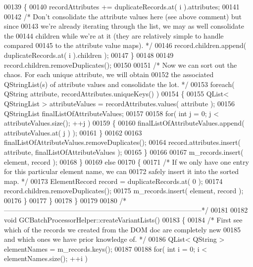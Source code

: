 \begin{DoxyCode}
00139       \{
00140         recordAttributes += duplicateRecords.at( i ).attributes;
00141 
00142         \textcolor{comment}{/* Don't consolidate the attribute values here (see above comment) but
       since}
00143 \textcolor{comment}{          we're already iterating through the list, we may as well consolidate
       the}
00144 \textcolor{comment}{          children while we're at it (they are relatively simple to handle
       compared}
00145 \textcolor{comment}{          to the attribute value maps). */}
00146         record.children.append( duplicateRecords.at( i ).children );        
00147       \}
00148 
00149       record.children.removeDuplicates();
00150 
00151       \textcolor{comment}{/* Now we can sort out the chaos. For each unique attribute, we will
       obtain}
00152 \textcolor{comment}{        the associated QStringList(s) of attribute values and consolidate the
       lot. */}
00153       \textcolor{keywordflow}{foreach}( QString attribute, recordAttributes.uniqueKeys() )
00154       \{
00155         QList< QStringList > attributeValues = recordAttributes.values( 
      attribute );
00156         QStringList finalListOfAttributeValues;
00157 
00158         \textcolor{keywordflow}{for}( \textcolor{keywordtype}{int} j = 0; j < attributeValues.size(); ++j )
00159         \{
00160           finalListOfAttributeValues.append( attributeValues.at( j ) );
00161         \}
00162 
00163         finalListOfAttributeValues.removeDuplicates();
00164         record.attributes.insert( attribute, finalListOfAttributeValues );
00165       \}
00166 
00167       m\_records.insert( element, record );
00168     \}
00169     \textcolor{keywordflow}{else}
00170     \{
00171       \textcolor{comment}{/* If we only have one entry for this particular element name, we can}
00172 \textcolor{comment}{        safely insert it into the sorted map. */}
00173       ElementRecord record = duplicateRecords.at( 0 );
00174       record.children.removeDuplicates();
00175       m\_records.insert( element, record );
00176     \}
00177   \}
00178 \}
00179 
00180 \textcolor{comment}{/*
      --------------------------------------------------------------------------------------*/}
00181 
00182 \textcolor{keywordtype}{void} GCBatchProcessorHelper::createVariantLists()
00183 \{
00184   \textcolor{comment}{/* First see which of the records we created from the DOM doc are completely
       new}
00185 \textcolor{comment}{    and which ones we have prior knowledge of. */}
00186   QList< QString > elementNames = m\_records.keys();
00187 
00188   \textcolor{keywordflow}{for}( \textcolor{keywordtype}{int} i = 0; i < elementNames.size(); ++i )

\end{DoxyCode}
